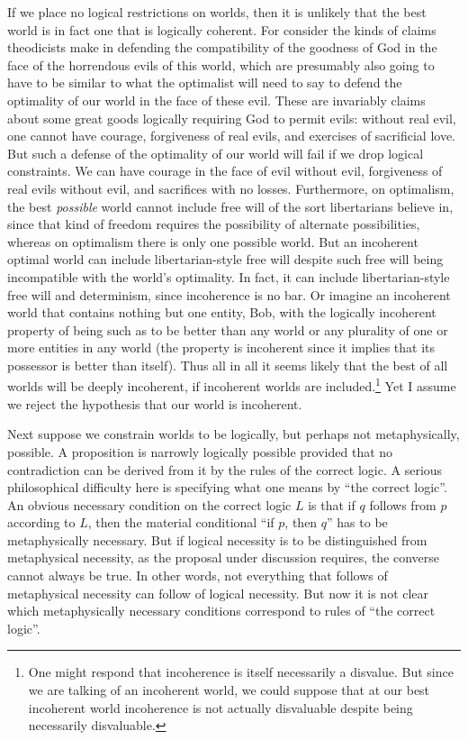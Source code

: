 If we place no logical restrictions on worlds, then it is unlikely that the best world is in fact one that is 
logically coherent. For consider the kinds of claims theodicists make in defending the compatibility of 
the goodness of God in the face of the horrendous evils of this world, which are presumably also going to have 
to be similar to what the optimalist will need to say to defend the optimality of our world in the face of these
evil. These are invariably claims about some great goods logically requiring God to permit evils: without real evil,
one cannot have courage, forgiveness of real evils, and exercises of sacrificial love. But such a defense of the 
optimality of our world will fail if we drop logical constraints. We can have courage in the face of evil without evil,
forgiveness of real evils without evil, and sacrifices with no losses. Furthermore, on optimalism, the best 
\textit{possible} world cannot include free will of the sort libertarians believe in, since that kind of freedom
requires the possibility of alternate possibilities, whereas on optimalism there is only one possible world. But an 
incoherent optimal world can include libertarian-style free will despite such free will being incompatible with the
world's optimality. In fact, it can include libertarian-style free will and determinism, since incoherence is no 
bar. Or imagine an incoherent world that contains nothing but one entity, Bob, with the logically incoherent property 
of being such as to be better than any world or any plurality of one or more entities in any world (the property is incoherent
since it implies that its possessor is better than itself). Thus all in all it seems likely that the best of all worlds will be deeply incoherent, if incoherent worlds are
included.\footnote{One might respond that incoherence is itself necessarily a disvalue. But since we are talking of an incoherent world, we could 
suppose that at our best incoherent world incoherence is not actually disvaluable despite being necessarily 
disvaluable.} Yet I assume we reject the hypothesis that our world is incoherent.

Next suppose we constrain worlds to be logically, but perhaps not metaphysically, possible. A proposition is narrowly logically
possible provided that no contradiction can be derived from it by the rules of the correct logic. A serious philosophical 
difficulty here is specifying what one means by ``the correct logic''. An obvious necessary condition on the correct logic $L$
is that if $q$ follows from $p$ according to $L$, then the material conditional ``if $p$, then $q$'' has to be metaphysically
necessary. But if logical necessity is to be distinguished from metaphysical necessity, as the proposal under discussion requires,
the converse cannot always be true. In other words, not everything that follows of metaphysical necessity can follow of logical
necessity. But now it is not clear which metaphysically necessary conditions correspond to rules of ``the correct logic''.

